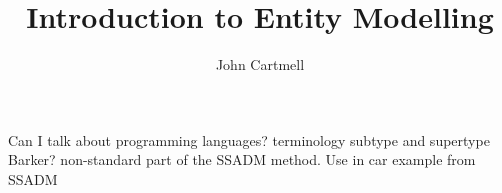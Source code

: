 \documentclass[10pt,a4paper]{article}
\title{Introduction to Entity Modelling}
\author{John Cartmell}
\newcommand{\srcFolder}{../src}
\begin{document}
\maketitle
\label{tableofcontents}
\tableofcontents
\label{contents}

 
 
 
 
 
 
 
 
 
 
 
 
 
 
  
 
 Can I talk about programming languages? 
terminology subtype and supertype Barker?
non-standard part of the SSADM method.
Use in car example from SSADM


\appendix



\end{document}
